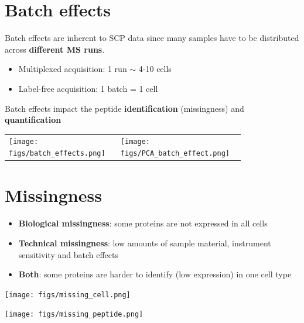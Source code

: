 \documentclass{article}
\begin{document}
\begin{multicols}{2}
\begin{minipage}[t]{\linewidth}
  \section*{\huge Batch effects}

  Batch effects are inherent to SCP data since many samples have to 
  be distributed across \textbf{different MS runs}. 
  
  \begin{itemize}
    \item Multiplexed acquisition: 1 run $\sim$ 4-10 cells
    \item Label-free acquisition: 1 batch = 1 cell
  \end{itemize}
  
  Batch effects impact the peptide \textbf{identification} 
  (missingness) and \textbf{quantification}

  \begin{tabular}{p{0.4\linewidth} p{0.4\linewidth}}
    \vspace{0pt} \texttt{[image: figs/batch\_effects.png]} &
    \vspace{0pt} \texttt{[image: figs/PCA\_batch\_effect.png]}
  \end{tabular}
  
\end{minipage}


\noindent
\vspace{-1cm}
\section*{\huge Missingness}
\begin{minipage}[h]{0.35\linewidth}
  
  \begin{itemize}
    \item \textbf{Biological missingness}: some proteins are not 
    expressed in all cells
    \item \textbf{Technical missingness}: low amounts of sample 
    material, instrument sensitivity and batch effects
    \item \textbf{Both}: some proteins are harder to identify (low 
    expression) in one cell type
  \end{itemize}
  
  \texttt{[image: figs/missing\_cell.png]}

\end{minipage}\hspace{0.45cm}
\begin{minipage}[h]{0.6\linewidth}
  \texttt{[image: figs/missing\_peptide.png]}
  

\end{minipage}
\end{multicols}
\end{document}
